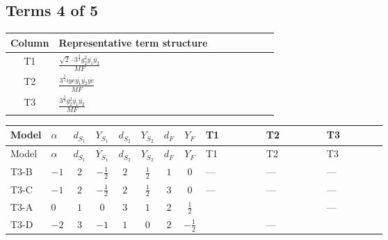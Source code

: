 \documentclass[8pt]{article}
\begin{document}
\begin{landscape}
\subsection*{Terms 4 of 5}
\begin{center}
\begin{tabular}{@{}c >{\raggedright\arraybackslash}p{0.82\linewidth}@{}}
\toprule
Column & Representative term structure \\
\midrule
T1 & \(\displaystyle \frac{\sqrt{2} \cdot 3^{\frac{3}{4}} g_{2}^{2} \overline{y_{1}} \overline{y_{2}}}{MF}\) \\
\midrule
T2 & \(\displaystyle \frac{3^{\frac{3}{4}} i ye \overline{y_{1}} \overline{y_{2}} \overline{ye}}{MF}\) \\
\midrule
T3 & \(\displaystyle \frac{3^{\frac{3}{4}} g_{2}^{2} \overline{y_{1}} \overline{y_{2}}}{MF}\) \\
\midrule
\bottomrule
\end{tabular}
\end{center}
\smallskip
\tiny
\begin{longtable}{@{}llcccccc >{\raggedright\arraybackslash}p{0.21\linewidth} >{\raggedright\arraybackslash}p{0.21\linewidth} >{\raggedright\arraybackslash}p{0.21\linewidth}@{}}
\toprule
Model & $\alpha$ & $d_{S_1}$ & $Y_{S_1}$ & $d_{S_2}$ & $Y_{S_2}$ & $d_F$ & $Y_F$ & T1 & T2 & T3 \\
\midrule
\endfirsthead
\toprule
Model & $\alpha$ & $d_{S_1}$ & $Y_{S_1}$ & $d_{S_2}$ & $Y_{S_2}$ & $d_F$ & $Y_F$ & T1 & T2 & T3 \\
\midrule
\endhead
T3-B & $-1$ & $2$ & $-\frac{1}{2}$ & $2$ & $\frac{1}{2}$ & $1$ & $0$ & --- & --- & --- \\
\midrule
T3-C & $-1$ & $2$ & $-\frac{1}{2}$ & $2$ & $\frac{1}{2}$ & $3$ & $0$ & --- & --- & --- \\
\midrule
T3-A & $0$ & $1$ & $0$ & $3$ & $1$ & $2$ & $\frac{1}{2}$ & \scriptsize\adjustbox{max width=\linewidth}{$\begin{gathered} \frac{\sqrt{2} \cdot 3^{\frac{3}{4}} g_{2}^{2} \overline{y_{1}} \overline{y_{2}}}{3 MF}\end{gathered}$} & \scriptsize\adjustbox{max width=\linewidth}{$\begin{gathered} \frac{3^{\frac{3}{4}} i ye \overline{y_{1}} \overline{y_{2}} \overline{ye}}{12 MF}\end{gathered}$} & --- \\
\midrule
T3-D & $-2$ & $3$ & $-1$ & $1$ & $0$ & $2$ & $-\frac{1}{2}$ & \scriptsize\adjustbox{max width=\linewidth}{$\begin{gathered} - \frac{\sqrt{2} \cdot 3^{\frac{3}{4}} g_{2}^{2} \overline{y_{1}} \overline{y_{2}}}{3 MF}\end{gathered}$} & --- & \scriptsize\adjustbox{max width=\linewidth}{$\begin{gathered} - \frac{17 \cdot 3^{\frac{3}{4}} g_{2}^{2} \overline{y_{1}} \overline{y_{2}}}{24 MF}\end{gathered}$} \\

\end{longtable}
\end{landscape}
\end{document}
